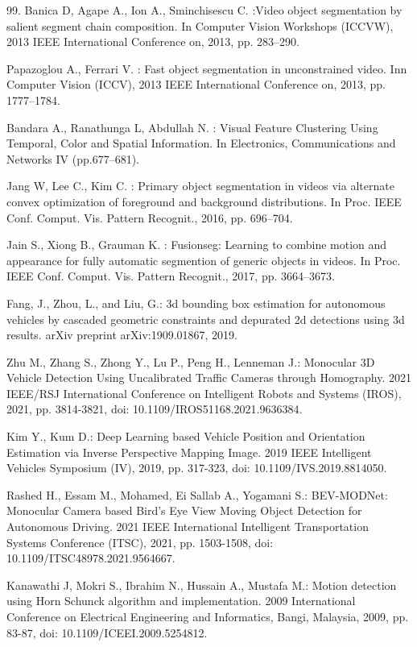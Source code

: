\begin{thebibliography}{99.}
Banica D, Agape A., Ion A., Sminchisescu C. :Video object
segmentation by salient segment chain composition. In Computer
Vision Workshops (ICCVW), 2013 IEEE International Conference on,
2013, pp. 283–290.

Papazoglou A., Ferrari V. : Fast object segmentation in
unconstrained video. Inn Computer Vision (ICCV), 2013 IEEE
International Conference on, 2013, pp. 1777–1784.

Bandara A., Ranathunga L, Abdullah N. : Visual Feature
Clustering Using Temporal, Color and Spatial Information.
In Electronics, Communications and Networks IV (pp.677–681).

Jang W, Lee C., Kim C. : Primary object segmentation in
videos via alternate convex optimization of foreground and background
distributions. In Proc. IEEE Conf. Comput. Vis. Pattern Recognit., 2016,
pp. 696–704.

Jain S., Xiong B., Grauman K. : Fusionseg: Learning to combine
motion and appearance for fully automatic segmention of generic objects
in videos. In Proc. IEEE Conf. Comput. Vis. Pattern Recognit., 2017,
pp. 3664–3673.

Fang, J., Zhou, L., and Liu, G.:
3d bounding box estimation for autonomous vehicles by cascaded geometric constraints and depurated 2d detections using 3d results.
arXiv preprint arXiv:1909.01867, 2019.

Zhu M., Zhang S., Zhong Y., Lu P., Peng H., Lenneman J.:
Monocular 3D Vehicle Detection Using Uncalibrated Traffic Cameras through Homography.
2021 IEEE/RSJ International Conference on Intelligent Robots and Systems (IROS), 2021, pp. 3814-3821, doi: 10.1109/IROS51168.2021.9636384.

Kim Y., Kum D.:
Deep Learning based Vehicle Position and Orientation Estimation via Inverse Perspective Mapping Image.
2019 IEEE Intelligent Vehicles Symposium (IV), 2019, pp. 317-323, doi: 10.1109/IVS.2019.8814050.

Rashed H., Essam M., Mohamed, Ei Sallab A., Yogamani S.:
BEV-MODNet: Monocular Camera based Bird's Eye View Moving Object Detection for Autonomous Driving.
2021 IEEE International Intelligent Transportation Systems Conference (ITSC), 2021, pp. 1503-1508, doi: 10.1109/ITSC48978.2021.9564667.

 Kanawathi J, Mokri S., Ibrahim N., Hussain A., Mustafa M.: Motion detection using Horn Schunck algorithm and implementation. 2009 International Conference on Electrical Engineering and Informatics, Bangi, Malaysia, 2009, pp. 83-87, doi: 10.1109/ICEEI.2009.5254812.


\end{thebibliography}
